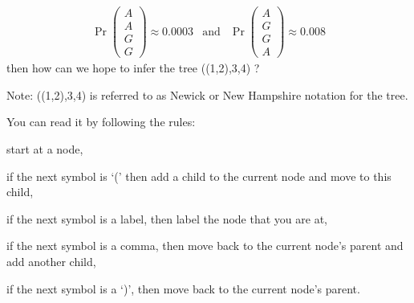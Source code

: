 \documentclass[landscape]{foils}
\begin{document}
\begin{eqnarray*}
\Pr
\left(
\begin{array}{c}
 A \\
 A \\
 G \\   
 G 
\end{array}
\right)\approx 0.0003 &\mbox{and} & \Pr
\left(
\begin{array}{c}
 A \\
 G \\
 G \\   
 A 
\end{array}
\right) \approx 0.008
\end{eqnarray*}
then how can we hope to infer the tree ((1,2),3,4) ?

\myNewSlide
\Large
Note:
((1,2),3,4) is referred to as Newick or New Hampshire notation for the tree.

You can read it by following the rules:
\begin{compactitem}
	\item start at a node,
	\item if the next symbol is `(' then add a child to the current node and move to this child,
	\item if the next symbol is a label, then label the node that you are at,
	\item if the next symbol is a comma, then move back to the current node's parent and add another child,
	\item if the next symbol is a `)', then move back to the current node's parent.
\end{compactitem}







\end{document}
